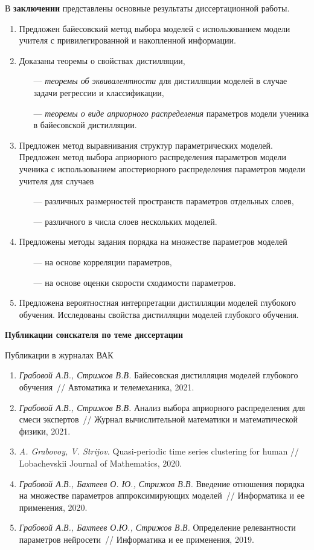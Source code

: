 \documentclass{dissert}
\begin{document}
В \textbf{заключении} представлены основные результаты диссертационной работы.
\begin{enumerate}
    \item Предложен байесовский метод выбора моделей с использованием модели учителя с привилегированной и накопленной информации.
    \item Доказаны теоремы о свойствах дистилляции, 
    \begin{itemize}
        \item[---] \emph{теоремы об эквивалентности} для дистилляции моделей в случае задачи регрессии и классификации,
        \item[---] \emph{теоремы о виде априорного распределения} параметров модели ученика в байесовской дистилляции.
    \end{itemize}
    \item Предложен метод выравнивания структур параметрических моделей. Предложен метод выбора априорного распределения параметров модели ученика с использованием апостериорного распределения параметров модели учителя для случаев
    \begin{itemize}
        \item[---] различных размерностей пространств параметров отдельных слоев,
        \item[---] различного в числа слоев нескольких моделей.
    \end{itemize}
    \item Предложены методы задания порядка на множестве параметров моделей
    \begin{itemize}
        \item[---] на основе корреляции параметров,
        \item[---] на основе оценки скорости сходимости параметров.
    \end{itemize}
    \item Предложена вероятностная интерпретации дистилляции моделей глубокого обучения. Исследованы свойства дистилляции моделей глубокого обучения.
\end{enumerate}

\textbf{Публикации соискателя по теме диссертации}

Публикации в журналах ВАК
\begin{enumerate}
    \item \textit{Грабовой А.В., Стрижов В.В.} Байесовская дистилляция моделей глубокого обучения~// Автоматика и телемеханика, 2021.
    \item \textit{Грабовой А.В., Стрижов В.В.} Анализ выбора априорного распределения для смеси экспертов~// Журнал вычислительной математики и математической физики, 2021.
    \item \textit{A. Grabovoy, V. Strijov.} Quasi-periodic time series clustering for human // Lobachevskii Journal of Mathematics, 2020.
    \item \textit{Грабовой А.В., Бахтеев О. Ю., Стрижов В.В.} Введение отношения порядка на множестве параметров аппроксимирующих моделей~// Информатика и ее применения, 2020.
    \item \textit{Грабовой А.В., Бахтеев О.Ю., Стрижов В.В.} Определение релевантности параметров нейросети~// Информатика и ее применения, 2019.
\end{enumerate}
\end{document}
